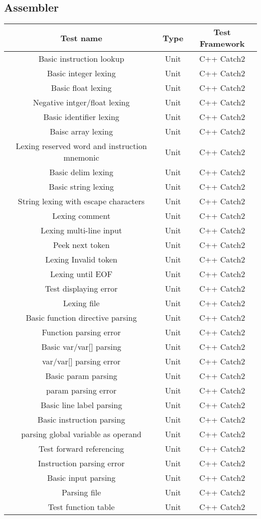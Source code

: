 \documentclass[manuscript,screen,nonacm]{acmart}
\begin{document}
\subsection{Assembler}
\begin{center}
\begin{tabular}{|c|c|c|}
    \hline
    Test name & Type & Test Framework \\
    \hline
    Basic instruction lookup & Unit & C++ Catch2 \\
    Basic integer lexing & Unit & C++ Catch2 \\
    Basic float lexing & Unit & C++ Catch2 \\
    Negative intger/float lexing & Unit & C++ Catch2 \\
    Basic identifier lexing & Unit & C++ Catch2 \\
    Baisc array lexing & Unit & C++ Catch2 \\
    Lexing reserved word and instruction mnemonic & Unit & C++ Catch2 \\
    Basic delim lexing & Unit & C++ Catch2 \\
    Basic string lexing & Unit & C++ Catch2 \\
    String lexing with escape characters & Unit & C++ Catch2 \\
    Lexing comment & Unit & C++ Catch2 \\
    Lexing multi-line input & Unit & C++ Catch2 \\
    Peek next token & Unit & C++ Catch2 \\
    Lexing Invalid token & Unit & C++ Catch2 \\
    Lexing until EOF & Unit & C++ Catch2 \\
    Test displaying error & Unit & C++ Catch2 \\
    Lexing file & Unit & C++ Catch2 \\
    Basic function directive parsing & Unit & C++ Catch2 \\
    Function parsing error & Unit & C++ Catch2 \\
    Basic var/var[] parsing & Unit & C++ Catch2 \\
    var/var[] parsing error & Unit & C++ Catch2 \\
    Basic param parsing & Unit & C++ Catch2 \\
    param parsing error & Unit & C++ Catch2 \\
    Basic line label parsing & Unit & C++ Catch2 \\
    Basic instruction parsing & Unit & C++ Catch2 \\
    parsing global variable as operand & Unit & C++ Catch2 \\
    Test forward referencing & Unit & C++ Catch2 \\
    Instruction parsing error & Unit & C++ Catch2 \\
    Basic input parsing & Unit & C++ Catch2 \\
    Parsing file & Unit & C++ Catch2 \\
    Test function table & Unit & C++ Catch2 \\
    \hline
\end{tabular}
\end{center}
\end{document}
